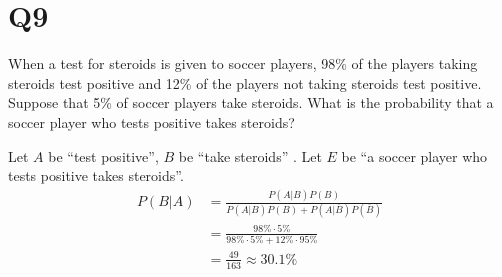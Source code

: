 \documentclass[11pt]{article}
\begin{document}
\section*{Q9}
When a test for steroids is given to soccer players, 98\% of the
players taking steroids test positive and 12\% of the players not
taking steroids test positive. Suppose that 5\% of soccer
players take steroids. What is the probability that a soccer
player who tests positive takes steroids?
\begin{solution}
    Let $A$ be ``test positive'', $B$ be ``take steroids'' .
    Let $E$ be ``a soccer
    player who tests positive takes steroids''.
    \begin{align*}
        P(B \vert A)&=\frac{P(A \vert B)P(B)}{P(A \vert B)P(B)+P(A \vert \overline{B})P(\overline{B})}\\
        &=\frac{98\%\cdot 5\%}{98\%\cdot 5\%+12\%\cdot 95\%}\\
        &=\frac{49}{163}\approx 30.1\%
    \end{align*}
\end{solution}
\end{document}
